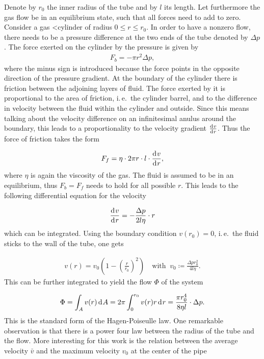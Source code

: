 Denote by $r_0$ the inner radius of the tube and by $l$ its
length. Let furthermore the gas flow be in an equilibrium state, such
that all forces need to add to zero. Consider a gas <cylinder of radius
$0 \leq r \leq r_0$. In order to have a nonzero flow, there needs to be a
pressure difference at the two ends of the tube denoted by $\Delta
p$. The force exerted on the cylinder by the pressure is given by
\begin{align*}
  F_b = - \pi r^2 \Delta p,
\end{align*}
where the minus sign is introduced because the force points in the
opposite direction of the pressure gradient. At the boundary of the
cylinder there is friction between the adjoining layers of fluid. The
force exerted by it is proportional to the area of friction, i.\,e.\
the cylinder barrel, and to the difference in velocity between the
fluid within the cylinder and outside. Since this means talking about
the velocity difference on an infinitesimal anulus around the
boundary, this leads to a proportionality to the velocity gradient
$\frac{\d[v]}{\d[r]}$. Thus the force of friction takes the form

\begin{align*}
  F_f = \eta \cdot 2\pi r \cdot l \cdot \frac{\d[v]}{\d[r]},
\end{align*}
where $\eta$ is again the viscosity of the gas. The fluid is assumed
to be in an equilibrium, thus $F_b = F_f$ needs to hold for all
possible $r$. This leads to the following differential equation for
the velocity

\begin{align*}
  \frac{\d[v]}{\d[r]} = - \frac{\Delta p}{2l\eta} \cdot r
\end{align*}
which can be integrated. Using the boundary condition $v(r_0)
= 0$, i.\,e.\ the fluid sticks to the wall of the tube, one gets

\begin{align}
  v(r) = v_0 \left ( 1 - \left( \frac{r}{r_0} \right)^2 \right) \quad
  \text{with }\ v_0 \coloneqq \frac{\Delta p r_0^2}{4 l \eta}. \label{eq:v}
\end{align}
This can be further integrated to yield the flow $\Phi$ of the system

\begin{align*}
  \Phi = \int_A v(r) \d[A] = 2\pi \int_0^{r_0} v(r)r \d[r] = \frac{\pi
  r_0^4}{8\eta l} \cdot \Delta p.
\end{align*}
This is the standard form of the Hagen-Poiseulle law. One remarkable
observation is that there is a power four law between the radius of
the tube and the flow. More interesting for this work is the relation
between the average velocity $\bar v$ and the maximum velocity $v_0$
at the center of the pipe

